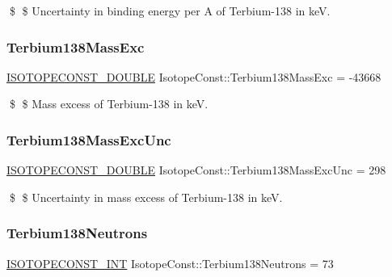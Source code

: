 \$ \$ Uncertainty in binding energy per A of Terbium-\/138 in keV. \mbox{\label{group___isotope_const-_terbium-_tb138_gad0fa1f919fd189046ab484974555ba9d}} 
\subsubsection{\texorpdfstring{Terbium138\+Mass\+Exc}{Terbium138MassExc}}
{\footnotesize\ttfamily \mbox{\hyperlink{group___isotope_const-_macros_ga8f45a7272ce02c0b4c65c44636ed719a}{I\+S\+O\+T\+O\+P\+E\+C\+O\+N\+S\+T\+\_\+\+D\+O\+U\+B\+LE}} Isotope\+Const\+::\+Terbium138\+Mass\+Exc = -\/43668}

\$ \$ Mass excess of Terbium-\/138 in keV. \mbox{\label{group___isotope_const-_terbium-_tb138_gac397b9901fe95b0243c72d5563f61546}} 
\subsubsection{\texorpdfstring{Terbium138\+Mass\+Exc\+Unc}{Terbium138MassExcUnc}}
{\footnotesize\ttfamily \mbox{\hyperlink{group___isotope_const-_macros_ga8f45a7272ce02c0b4c65c44636ed719a}{I\+S\+O\+T\+O\+P\+E\+C\+O\+N\+S\+T\+\_\+\+D\+O\+U\+B\+LE}} Isotope\+Const\+::\+Terbium138\+Mass\+Exc\+Unc = 298}

\$ \$ Uncertainty in mass excess of Terbium-\/138 in keV. \mbox{\label{group___isotope_const-_terbium-_tb138_ga2ddeddfd125303ab9a96bd43be565cbd}} 
\subsubsection{\texorpdfstring{Terbium138\+Neutrons}{Terbium138Neutrons}}
{\footnotesize\ttfamily \mbox{\hyperlink{group___isotope_const-_macros_ga5f18360b3e99483a35c32d789e62621c}{I\+S\+O\+T\+O\+P\+E\+C\+O\+N\+S\+T\+\_\+\+I\+NT}} Isotope\+Const\+::\+Terbium138\+Neutrons = 73}

